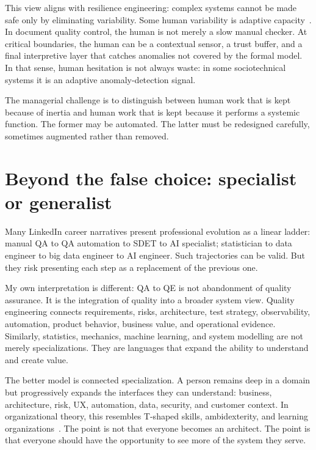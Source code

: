 \documentclass[11pt,a4paper]{article}
\begin{document}
This view aligns with resilience engineering: complex systems cannot be made safe only by eliminating variability. Some human variability is adaptive capacity \,\citep{hollnagel2011resilience}. In document quality control, the human is not merely a slow manual checker. At critical boundaries, the human can be a contextual sensor, a trust buffer, and a final interpretive layer that catches anomalies not covered by the formal model. In that sense, human hesitation is not always waste: in some sociotechnical systems it is an adaptive anomaly-detection signal.

The managerial challenge is to distinguish between human work that is kept because of inertia and human work that is kept because it performs a systemic function. The former may be automated. The latter must be redesigned carefully, sometimes augmented rather than removed.

\section{Beyond the false choice: specialist or generalist}
Many LinkedIn career narratives present professional evolution as a linear ladder: manual QA to QA automation to SDET to AI specialist; statistician to data engineer to big data engineer to AI engineer. Such trajectories can be valid. But they risk presenting each step as a replacement of the previous one.

My own interpretation is different: QA to QE is not abandonment of quality assurance. It is the integration of quality into a broader system view. Quality engineering connects requirements, risks, architecture, test strategy, observability, automation, product behavior, business value, and operational evidence. Similarly, statistics, mechanics, machine learning, and system modelling are not merely specializations. They are languages that expand the ability to understand and create value.

The better model is connected specialization. A person remains deep in a domain but progressively expands the interfaces they can understand: business, architecture, risk, UX, automation, data, security, and customer context. In organizational theory, this resembles T-shaped skills, ambidexterity, and learning organizations \,\citep{march1991exploration,senge1990fifth,argyris1978organizational,tushman1996ambidextrous}. The point is not that everyone becomes an architect. The point is that everyone should have the opportunity to see more of the system they serve.
\end{document}
